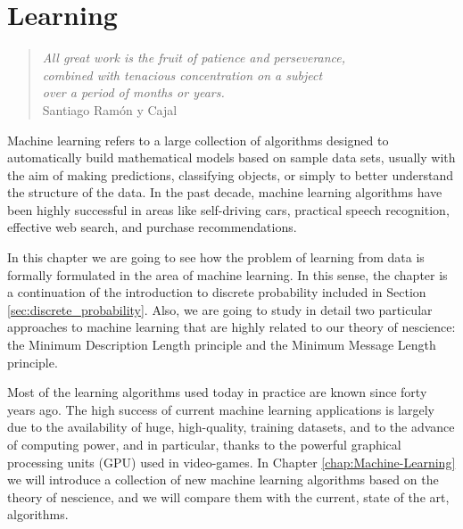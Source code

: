 %
%


\chapter{Learning}
\label{ch:Learning}

\begin{quote}
\begin{flushright}
\emph{All great work is the fruit of patience and perseverance,\\
combined with tenacious concentration on a subject\\
over a period of months or years.}\\
Santiago Ramón y Cajal
\end{flushright}
\end{quote}
\bigskip

Machine learning refers to a large collection of algorithms designed to automatically build mathematical models based on sample data sets, usually with the aim of making predictions, classifying objects, or simply to better understand the structure of the data. In the past decade, machine learning algorithms have been highly successful in areas like self-driving cars, practical speech recognition, effective web search, and purchase recommendations.

In this chapter we are going to see how the problem of learning from data is formally formulated in the area of machine learning. In this sense, the chapter is a continuation of the introduction to discrete probability included in Section \ref{sec:discrete_probability}. Also, we are going to study in detail two particular approaches to machine learning that are highly related to our theory of nescience: the Minimum Description Length principle and the Minimum Message Length principle.

Most of the learning algorithms used today in practice are known since forty years ago. The high success of current machine learning applications is largely due to the availability of huge, high-quality, training datasets, and to the advance of computing power, and in particular, thanks to the powerful graphical processing units (GPU) used in video-games. In Chapter \ref{chap:Machine-Learning} we will introduce a collection of new machine learning algorithms based on the theory of nescience, and we will compare them with the current, state of the art, algorithms.

